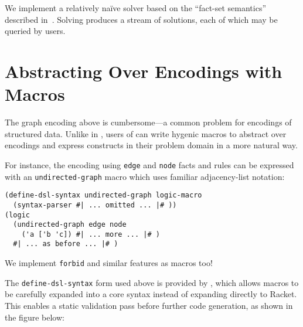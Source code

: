 \documentclass[dvipsnames,sigplan,screen,acmthm,nonacm]{acmart}
\begin{document}
We implement a relatively naïve solver based on the ``fact-set semantics''
described in~\cite{martens2025dusa}. Solving produces a stream of solutions,
each of which may be queried by users.

\section{Abstracting Over Encodings with Macros}

The graph encoding above is cumbersome---a common problem
for encodings of structured data. Unlike in \Dusa{}, users of 
\miniDusa{} can write hygenic macros to abstract over encodings
and express constructs in their problem domain in a more natural way.

For instance, the encoding using \texttt{edge} and \texttt{node}
facts and rules can be expressed with an \texttt{undirected-graph}
macro which uses familiar adjacency-list notation:

\begin{verbatim}
(define-dsl-syntax undirected-graph logic-macro
  (syntax-parser #| ... omitted ... |# ))
(logic
  (undirected-graph edge node
    ('a ['b 'c]) #| ... more ... |# )
  #| ... as before ... |# )
\end{verbatim}
We implement \texttt{forbid} and similar features as macros too!

The \texttt{define-dsl-syntax} form used above is provided by \syntaxspec{},
which allows \miniDusa{} macros to be carefully expanded into a core syntax
instead of expanding directly to Racket.
This enables a static validation pass before further code generation,
as shown in the figure below:
\end{document}
